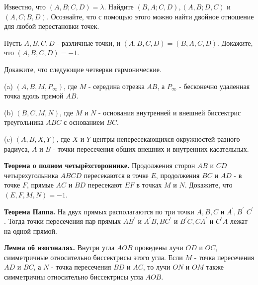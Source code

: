 \newpage

\hspace{3mm}

Известно, что $(A, B ; C, D)=\lambda$. Найдите $(B, A ; C, D),(A, B ; D, C)$ и $(A, C ; B, D)$. Осознайте, что с помощью этого можно найти двойное отношение для любой перестановки точек.

 Пусть $A, B, C, D$ - различные точки, и $(A, B, C, D)=(B, A, C, D)$. Докажите, что $(A, B, C, D)=-1$.

 Докажите, что следующие четверки гармонические.

(a) $\left(A, B, M, P_{\infty}\right)$, где $M$ - середина отрезка $A B$, а $P_{\infty}$ - бесконечно удаленная точка вдоль прямой $A B$.

(b) $(B, C, M, N)$, где $M$ и $N$ - основания внутренней и внешней биссектрис треугольника $A B C$ с основанием $B C$.

(c) $(A, B, X, Y)$, где $X$ и $Y$ центры непересекающихся окружностей разного радиуса, $A$ и $B$ - точки пересечения общих внешних и внутренних касательных.

\textbf{Теорема о полном четырёхстороннике.} Продолжения сторон $A B$ и $C D$ четырехугольника $A B C D$ пересекаются в точке $E$, продолжения $B C$ и $A D$ - в точке $F$, прямые $A C$ и $B D$ пересекают $E F$ в точках $M$ и $N$. Докажите, что $(E, F, M, N)=-1$.

\textbf{Теорема Паппа.} На двух прямых располагаются по три точки $A, B, C$ и $A^{\prime}, B^{\prime}$ $C^{\prime}$. Тогда точки пересечения пар прямых $A B^{\prime}$ и $A^{\prime} B, B C^{\prime}$ и $B^{\prime} C, C A^{\prime}$ и $C^{\prime} A$ лежат на одной прямой.

\textbf{Лемма об изогоналях.} Внутри угла $A O B$ проведены лучи $O D$ и $O C$, симметричные относительно биссектрисы этого угла. Если $M$ - точка пересечения $A D$ и $B C$, а $N$ - точка пересечения $B D$ и $A C$, то лучи $O N$ и $O M$ также симметричны относительно биссектрисы угла $A O B$.